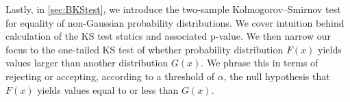 Lastly, in \cref{sec:BKStest}, we introduce the two-sample Kolmogorov–Smirnov test for equality of non-Gaussian probability distributions. We cover intuition behind calculation of the KS test statics and associated p-value. We then narrow our focus to the one-tailed KS test of whether probability distribution $F(x)$ yields values larger than another distribution $G(x)$. We phrase this in terms of rejecting or accepting, according to a threshold of $\alpha$, the null hypothesis that $F(x)$ yields values equal to or less than $G(x)$.